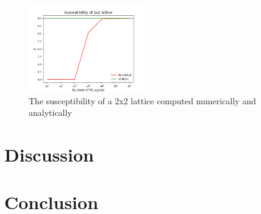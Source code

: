 \documentclass[notitlepage, reprint, nofootinbib]{revtex4-1}
\begin{document}
\begin{figure}
	\centering
	\includegraphics[width=0.45\textwidth]{../Figures/chi_4b.png}
	\caption{The susceptibility of a 2x2 lattice computed numerically and analytically}
	\label{fig4}
\end{figure}

\section{Discussion}

\section{Conclusion}


\onecolumngrid


\end{document}
